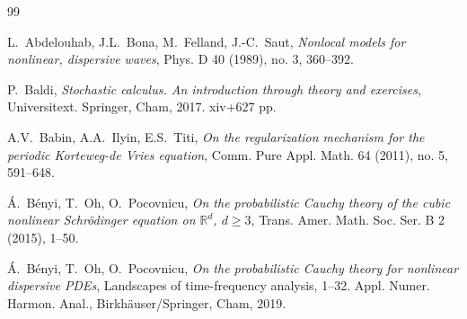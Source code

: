 \documentclass[letterpaper, 11pt,  reqno]{amsart}
\newcommand{\1}{\hspace{0.5mm}\text{I}\hspace{0.5mm}}
\newcommand{\R}{\mathbb{R}}
\numberwithin{equation}{section}
\numberwithin{theorem}{section}
\begin{document}
\begin{thebibliography}{99}


 L.~Abdelouhab, J.L.~Bona, M.~Felland, J.-C.~Saut,
{\it Nonlocal models for nonlinear, dispersive waves}, 
Phys. D 40 (1989), no. 3, 360--392.


%
%


P.~Baldi, 
{\it Stochastic calculus. An introduction through theory and exercises},
 Universitext. Springer, Cham, 2017. xiv+627 pp.


A.V.~Babin, A.A.~Ilyin, E.S.~Titi,
{\it On the regularization mechanism for the periodic Korteweg-de Vries equation}, 
Comm. Pure Appl. Math. 64 (2011), no. 5, 591--648.



%


%
%
%




%
%
%



\'A.~B\'enyi, T.~Oh, O.~Pocovnicu,
{\it On the probabilistic Cauchy theory of the cubic nonlinear Schr\"odinger equation on $\R^d$, $d\ge 3$}, 
Trans. Amer. Math. Soc. Ser. B 2 (2015), 1--50. 



\'A.~B\'enyi, T.~Oh, O.~Pocovnicu,
{\it  On the probabilistic Cauchy theory for nonlinear dispersive PDEs}, 
Landscapes of time-frequency analysis, 1--32. 
Appl. Numer. Harmon. Anal., 
Birkh\"auser/Springer, Cham, 2019.



%
%
%






\end{thebibliography}
\end{document}
